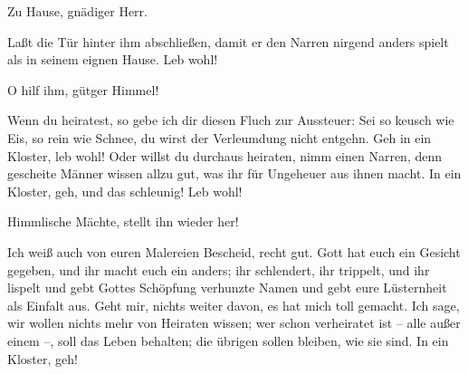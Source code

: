 Zu Hause, gnädiger Herr.

Laßt die Tür hinter ihm abschließen, damit er den Narren nirgend anders spielt
als in seinem eignen Hause. Leb wohl!

O hilf ihm, gütger Himmel!

Wenn du heiratest, so gebe ich dir diesen Fluch zur Aussteuer: Sei so keusch
wie Eis, so rein wie Schnee, du wirst der Verleumdung nicht entgehn. Geh in ein
Kloster, leb wohl! Oder willst du durchaus heiraten, nimm einen Narren, denn
gescheite Männer wissen allzu gut, was ihr für Ungeheuer aus ihnen macht. In
ein Kloster, geh, und das schleunig! Leb wohl!

Himmlische Mächte, stellt ihn wieder her!

Ich weiß auch von euren Malereien Bescheid, recht gut. Gott hat euch ein
Gesicht gegeben, und ihr macht euch ein anders; ihr schlendert, ihr trippelt,
und ihr lispelt und gebt Gottes Schöpfung verhunzte Namen und gebt eure
Lüsternheit als Einfalt aus. Geht mir, nichts weiter davon, es hat mich toll
gemacht. Ich sage, wir wollen nichts mehr von Heiraten wissen; wer schon
verheiratet ist -- alle außer einem --, soll das Leben behalten; die übrigen
sollen bleiben, wie sie sind. In ein Kloster, geh!
